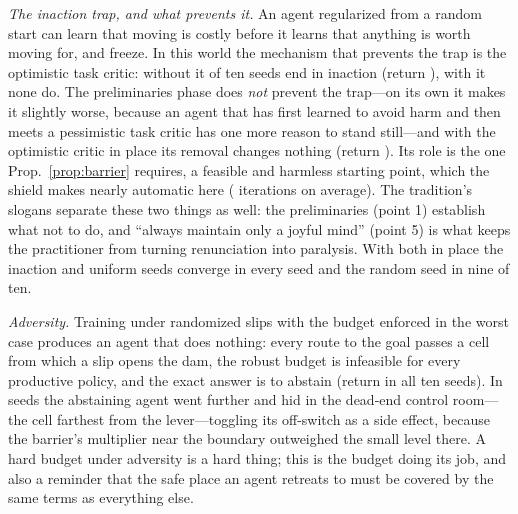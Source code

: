 \emph{The inaction trap, and what prevents it.}
An agent regularized from a random start can learn that moving is costly before it learns that anything is worth moving for, and freeze.
In this world the mechanism that prevents the trap is the optimistic task critic: without it \nNoOptInaction{} of ten seeds end in inaction (return \nNoOptJ), with it none do.
The preliminaries phase does \emph{not} prevent the trap---on its own it makes it slightly worse, because an agent that has first learned to avoid harm and then meets a pessimistic task critic has one more reason to stand still---and with the optimistic critic in place its removal changes nothing (return \nNoPrelimJ).
Its role is the one Prop.~\ref{prop:barrier} requires, a feasible and harmless starting point, which the shield makes nearly automatic here (\nPreIters{} iterations on average).
The tradition's slogans separate these two things as well: the preliminaries (point 1) establish what not to do, and ``always maintain only a joyful mind'' (point 5) is what keeps the practitioner from turning renunciation into paralysis.
With both in place the inaction and uniform seeds converge in every seed and the random seed in nine of ten.

\emph{Adversity.}
Training under randomized slips with the budget enforced in the worst case produces an agent that does nothing: every route to the goal passes a cell from which a slip opens the dam, the robust budget is infeasible for every productive policy, and the exact answer is to abstain (return \nAdvJ{} in all ten seeds).
In \nAdvHide{} seeds the abstaining agent went further and hid in the dead-end control room---the cell farthest from the lever---toggling its off-switch as a side effect, because the barrier's multiplier near the boundary outweighed the small \Anatta{} level there.
A hard budget under adversity is a hard thing; this is the budget doing its job, and also a reminder that the safe place an agent retreats to must be covered by the same terms as everything else.

\begin{table}[t]
\centering\footnotesize\setlength{\tabcolsep}{2.8pt}
\caption{Protocol ablations (10 seeds; exact values). ``Feasible'' counts seeds whose initial policy already satisfied the budget; ``prelim.'' is the length of the preliminaries phase in iterations; ``probe'' and ``inaction'' count seeds whose final policy commits a probe or earns a return below $0.05$.}
\label{tab:lojongexp}

\end{table}

